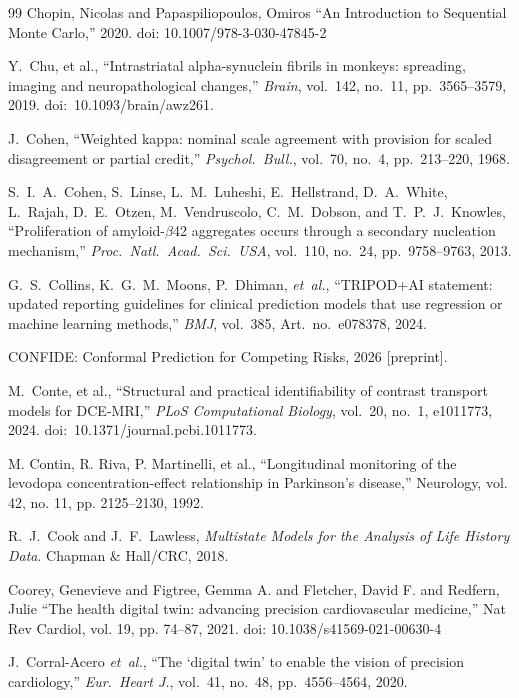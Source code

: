 \begin{thebibliography}{99}
 Chopin, Nicolas and Papaspiliopoulos, Omiros ``An Introduction to Sequential Monte Carlo,'' 2020. doi: 10.1007/978-3-030-47845-2

Y.~Chu, et al., ``Intrastriatal alpha-synuclein fibrils in monkeys: spreading, imaging and neuropathological changes,'' \textit{Brain}, vol.~142, no.~11, pp.~3565--3579, 2019. doi:~10.1093/brain/awz261.

J.~Cohen, ``Weighted kappa: nominal scale agreement with provision for scaled disagreement or partial credit,'' \textit{Psychol.\ Bull.}, vol.~70, no.~4, pp.~213--220, 1968.

S.~I.~A.~Cohen, S.~Linse, L.~M.~Luheshi, E.~Hellstrand, D.~A.~White, L.~Rajah, D.~E.~Otzen, M.~Vendruscolo, C.~M.~Dobson, and T.~P.~J.~Knowles, ``Proliferation of amyloid-$\beta$42 aggregates occurs through a secondary nucleation mechanism,'' \textit{Proc.\ Natl.\ Acad.\ Sci.\ USA}, vol.~110, no.~24, pp.~9758--9763, 2013.

G.~S.~Collins, K.~G.~M.~Moons, P.~Dhiman, \textit{et~al.}, ``TRIPOD+AI statement: updated reporting guidelines for clinical prediction models that use regression or machine learning methods,'' \textit{BMJ}, vol.~385, Art.\ no.~e078378, 2024.

CONFIDE: Conformal Prediction for Competing Risks, 2026 [preprint].

M.~Conte, et al., ``Structural and practical identifiability of contrast transport models for DCE-MRI,'' \textit{PLoS Computational Biology}, vol.~20, no.~1, e1011773, 2024. doi:~10.1371/journal.pcbi.1011773.

 M. Contin, R. Riva, P. Martinelli, et al., ``Longitudinal monitoring of the levodopa concentration-effect relationship in Parkinson's disease,'' Neurology, vol. 42, no. 11, pp. 2125--2130, 1992.

R.~J.~Cook and J.~F.~Lawless, \textit{Multistate Models for the Analysis of Life History Data}. Chapman \& Hall/CRC, 2018.

 Coorey, Genevieve and Figtree, Gemma A. and Fletcher, David F. and Redfern, Julie ``The health digital twin: advancing precision cardiovascular medicine,'' Nat Rev Cardiol, vol. 19, pp. 74--87, 2021. doi: 10.1038/s41569-021-00630-4

J.~Corral-Acero \textit{et~al.}, ``The `digital twin' to enable the vision of precision cardiology,'' \textit{Eur.\ Heart J.}, vol.~41, no.~48, pp.~4556--4564, 2020.


\end{thebibliography}
